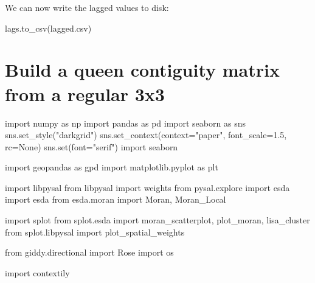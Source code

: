 \documentclass[
  letterpaper,
  DIV=11,
  numbers=noendperiod]{scrreprt}
\newenvironment{Shaded}{\begin{snugshade}}{\end{snugshade}}
\newcommand{\BuiltInTok}[1]{\textcolor[rgb]{0.00,0.23,0.31}{#1}}
\newcommand{\FloatTok}[1]{\textcolor[rgb]{0.68,0.00,0.00}{#1}}
\newcommand{\ImportTok}[1]{\textcolor[rgb]{0.00,0.46,0.62}{#1}}
\newcommand{\NormalTok}[1]{\textcolor[rgb]{0.00,0.23,0.31}{#1}}
\newcommand{\OperatorTok}[1]{\textcolor[rgb]{0.37,0.37,0.37}{#1}}
\newcommand{\StringTok}[1]{\textcolor[rgb]{0.13,0.47,0.30}{#1}}
\newcommand{\VariableTok}[1]{\textcolor[rgb]{0.07,0.07,0.07}{#1}}
\begin{document}
We can now write the lagged values to disk:

\begin{Shaded}
\begin{Highlighting}[]
\NormalTok{lags.to\_csv(}\StringTok{\textquotesingle{}lagged.csv\textquotesingle{}}\NormalTok{)}
\end{Highlighting}
\end{Shaded}


\chapter{Build a queen contiguity matrix from a regular
3x3}\label{build-a-queen-contiguity-matrix-from-a-regular-3x3}

\begin{Shaded}
\begin{Highlighting}[]
\ImportTok{import}\NormalTok{ numpy }\ImportTok{as}\NormalTok{ np}
\ImportTok{import}\NormalTok{ pandas }\ImportTok{as}\NormalTok{ pd}
\ImportTok{import}\NormalTok{ seaborn }\ImportTok{as}\NormalTok{ sns}
\NormalTok{sns.set\_style(}\StringTok{"darkgrid"}\NormalTok{)}
\NormalTok{sns.set\_context(context}\OperatorTok{=}\StringTok{"paper"}\NormalTok{, font\_scale}\OperatorTok{=}\FloatTok{1.5}\NormalTok{, rc}\OperatorTok{=}\VariableTok{None}\NormalTok{)}
\NormalTok{sns.}\BuiltInTok{set}\NormalTok{(font}\OperatorTok{=}\StringTok{"serif"}\NormalTok{)}
\ImportTok{import}\NormalTok{ seaborn}

\ImportTok{import}\NormalTok{ geopandas }\ImportTok{as}\NormalTok{ gpd}
\ImportTok{import}\NormalTok{ matplotlib.pyplot }\ImportTok{as}\NormalTok{ plt}

\ImportTok{import}\NormalTok{ libpysal}
\ImportTok{from}\NormalTok{ libpysal  }\ImportTok{import}\NormalTok{ weights}
\ImportTok{from}\NormalTok{ pysal.explore }\ImportTok{import}\NormalTok{ esda }
\ImportTok{import}\NormalTok{ esda}
\ImportTok{from}\NormalTok{ esda.moran }\ImportTok{import}\NormalTok{ Moran, Moran\_Local}

\ImportTok{import}\NormalTok{ splot}
\ImportTok{from}\NormalTok{ splot.esda }\ImportTok{import}\NormalTok{ moran\_scatterplot, plot\_moran, lisa\_cluster}
\ImportTok{from}\NormalTok{ splot.libpysal }\ImportTok{import}\NormalTok{ plot\_spatial\_weights}

\ImportTok{from}\NormalTok{ giddy.directional }\ImportTok{import}\NormalTok{ Rose}
\ImportTok{import}\NormalTok{ os}

\ImportTok{import}\NormalTok{ contextily}


\end{Highlighting}
\end{Shaded}
\end{document}
